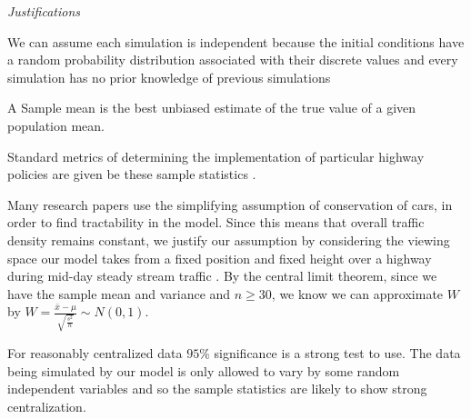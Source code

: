 \documentclass{amsart}
\begin{document}
	
	\textit{Justifications}
	
		We can assume each simulation is independent because the initial conditions have a random probability distribution associated with their discrete values and every simulation has no prior knowledge of previous simulations
	
		A Sample mean is the best unbiased estimate of the true value of a given population mean.

		Standard metrics of determining the implementation of particular highway policies are given be these sample statistics \cite{elvik2009handbook}.

		Many research papers use the simplifying assumption of conservation of cars, in order to find tractability in the model. Since this means that overall traffic density remains constant, we justify our assumption by considering the viewing space our model takes from a fixed position and fixed height over a highway during mid-day steady stream traffic \cite{seiboldconstructing}.
		By the central limit theorem, since we have the sample mean and variance and $n \geq 30$, we know we can approximate $W$ by $W=\frac{\bar x - \mu}{\sqrt{\frac{s^2}{n}}} \sim N(0,1)$.
		
		For reasonably centralized data $95\% $ significance is a strong test to use. The data being simulated by our model is only allowed to vary by some random independent variables and so the sample statistics are likely to show strong centralization. 
	
\newpage	
		
\end{document}
